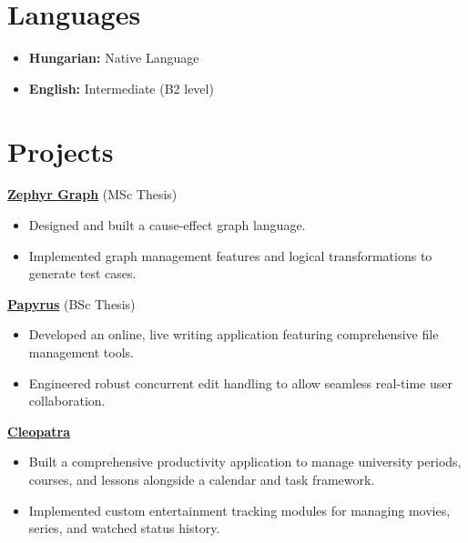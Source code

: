 \documentclass[11pt,a4paper]{article}
\begin{document}
\section{Languages}
\begin{itemize}[leftmargin=0, label={}]
    \item \textbf{Hungarian:} Native Language
    \item \textbf{English:} Intermediate (B2 level)
\end{itemize}

\section{Projects}
\textbf{\href{https://github.com/karcagtamas/ZephyrGraph}{Zephyr Graph}} (MSc Thesis)
\begin{itemize}[noitemsep,topsep=2pt,leftmargin=0.15in]
    \item Designed and built a cause-effect graph language.
    \item Implemented graph management features and logical transformations to generate test cases.
\end{itemize}

\vspace{4pt}
\textbf{\href{https://github.com/karcagtamas/Papyrus}{Papyrus}} (BSc Thesis)
\begin{itemize}[noitemsep,topsep=2pt,leftmargin=0.15in]
    \item Developed an online, live writing application featuring comprehensive file management tools.
    \item Engineered robust concurrent edit handling to allow seamless real-time user collaboration.
\end{itemize}

\vspace{4pt}
\textbf{\href{https://karcags.eu:9800}{Cleopatra}}
\begin{itemize}[noitemsep,topsep=2pt,leftmargin=0.15in]
    \item Built a comprehensive productivity application to manage university periods, courses, and lessons alongside a calendar and task framework.
    \item Implemented custom entertainment tracking modules for managing movies, series, and watched status history.
\end{itemize}
\end{document}
